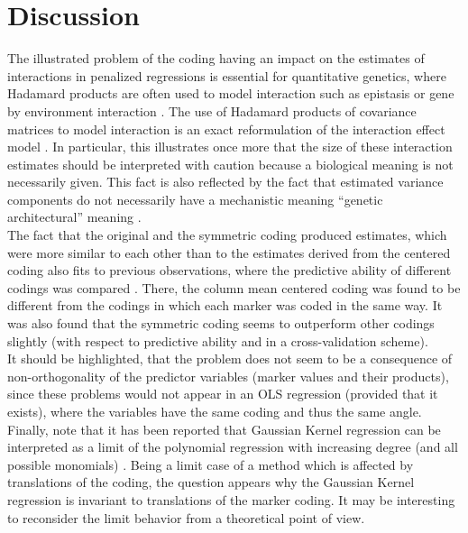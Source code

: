 \documentclass{bmcart}
\newcommand{\0}{\mathbf{0}}
\begin{document}
\section*{Discussion}
The illustrated problem of the coding having an impact on the estimates of interactions in penalized regressions is essential for quantitative genetics, where Hadamard products are often used to model interaction such as epistasis or gene by environment interaction \cite{perez17}. The use of Hadamard products of covariance matrices to model interaction is an exact reformulation of the interaction effect model \cite{jiang15,Martini16}. In particular, this illustrates once more that the size of these interaction estimates should be interpreted with caution because a biological meaning is not necessarily given. This fact is also reflected by the fact that estimated variance components do not necessarily have a mechanistic meaning ``genetic architectural'' meaning \cite{Huang16}.\\

The fact that the original and the symmetric coding produced estimates, which were more similar to each other than to the estimates derived from the centered coding also fits to previous observations, where the predictive ability of different codings was compared \cite{Martini17}. There, the column mean centered coding was found to be different from the codings in which each marker was coded in the same way. 
It was also found that the symmetric coding seems to outperform other codings slightly (with respect to predictive ability and in a cross-validation scheme). \\

It should be highlighted, that the problem does not seem to be a consequence of non-orthogonality of the predictor variables (marker values and their products), since these problems would not appear in an OLS regression (provided that it exists), where the variables have the same coding and thus the same angle. \\

Finally, note that it has been reported that Gaussian Kernel regression \cite{Morota14} can be interpreted as a limit of the polynomial regression with increasing degree (and all possible monomials) \cite{jiang15}. 
Being a limit case of a method which is affected by translations of the coding, the question appears why the Gaussian Kernel regression is invariant to translations of the marker coding. It may be interesting to reconsider the limit behavior from a theoretical point of view.
\end{document}
